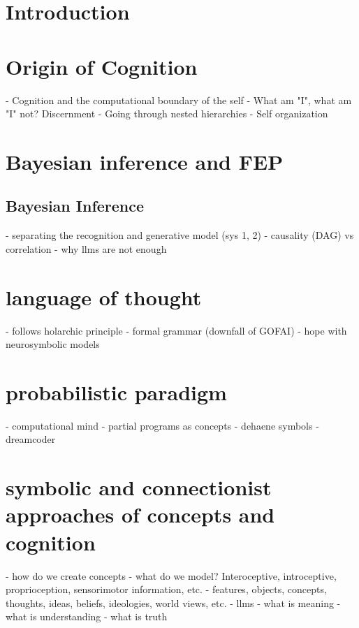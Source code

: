 \section{Introduction}

\section{Origin of Cognition}
- Cognition and the computational boundary of the self
- What am "I", what am "I" not? Discernment
- Going through nested hierarchies
- Self organization
\section{Bayesian inference and FEP}


\subsection{Bayesian Inference}
- separating the recognition and generative model (sys 1, 2)
- causality (DAG) vs correlation
- why llms are not enough

\section{language of thought}
- follows holarchic principle
- formal grammar (downfall of GOFAI)
- hope with neurosymbolic models

\section{probabilistic paradigm}
- computational mind
- partial programs as concepts
- dehaene symbols
- dreamcoder

\section{symbolic and connectionist approaches of concepts and cognition}
- how do we create concepts
- what do we model? Interoceptive, introceptive, proprioception, sensorimotor information, etc. 
- features, objects, concepts, thoughts, ideas, beliefs, ideologies, world views, etc. 
- llms
- what is meaning
- what is understanding
- what is truth




